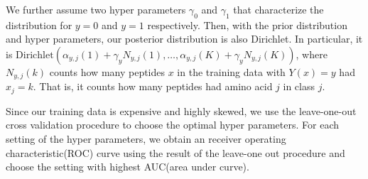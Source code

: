 \documentclass[12pt]{article}
\newcommand{\Dir}{\mathrm{Dirichlet}}
\begin{document}
We further assume two hyper parameters $\gamma_0$ and $\gamma_1$ that characterize the distribution for $y=0$ and $y=1$ respectively. Then, with the prior distribution and hyper parameters, our posterior distribution is also Dirichlet. In particular, it is 
$\Dir( \alpha_{y,j}(1) + \gamma_yN_{y,j}(1), \ldots, \alpha_{y,j}(K) + \gamma_yN_{y,j}(K))$,
where $N_{y,j}(k)$ counts how many peptides $x$ in the training data with $Y(x)=y$ had $x_j=k$.  That is, it counts how many peptides had amino acid $j$ in class $j$.

Since our training data is expensive and highly skewed, we use the leave-one-out cross validation procedure to choose the optimal hyper parameters. For each setting of the hyper parameters, we obtain an receiver operating characteristic(ROC) curve using the result of the leave-one out procedure and choose the setting with highest AUC(area under curve).

\end{document}
